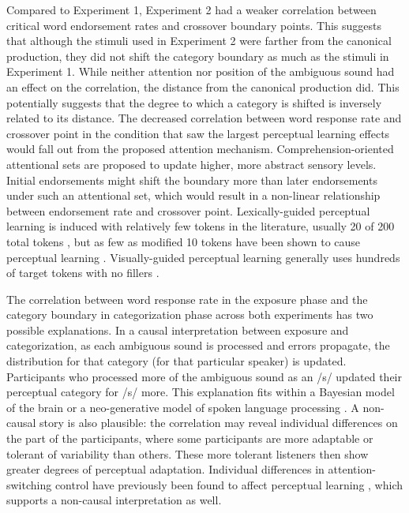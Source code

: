 Compared to Experiment 1, Experiment 2 had a weaker correlation between critical word endorsement rates and crossover boundary points.
This suggests that although the stimuli used in Experiment 2 were farther from the canonical production, they did not shift the category boundary as much as the stimuli in Experiment 1.  
While neither attention nor position of the ambiguous sound had an effect on the correlation, the distance from the canonical production did.  
This potentially suggests that the degree to which a category is shifted is inversely related to its distance.
The decreased correlation between word response rate and crossover point in the condition that saw the largest perceptual learning effects would fall out from the proposed attention mechanism.
Comprehension-oriented attentional sets are proposed to update higher, more abstract sensory levels.
Initial endorsements might shift the boundary more than later endorsements under such an attentional set, which would result in a non-linear relationship between endorsement rate and crossover point.
Lexically-guided perceptual learning is induced with relatively few tokens in the literature, usually 20 of 200 total tokens \citep{Norris2003, Reinish2013}, but as few as modified 10 tokens have been shown to cause perceptual learning \citep{Kraljic2008}.
Visually-guided perceptual learning generally uses hundreds of target tokens with no fillers \citep{Vroomen2007, Reinisch2014}.

The correlation between word response rate in the exposure phase and the category boundary in categorization phase across both experiments has two possible explanations. 
In a causal interpretation between exposure and categorization, as each ambiguous sound is processed and errors propagate, the distribution for that category (for that particular speaker) is updated.
Participants who processed more of the ambiguous sound as an /s/ updated their perceptual category for /s/ more. 
This explanation fits within a Bayesian model of the brain \citep{Clark2013} or a neo-generative model of spoken language processing \citep{Pierrehumbert2002}.  
A non-causal story is also plausible:  the correlation may reveal individual differences on the part of the participants, where some participants are more adaptable or tolerant of variability than others.
These more tolerant listeners then show greater degrees of perceptual adaptation. 
Individual differences in attention-switching control have previously been found to affect perceptual learning \citep{Scharenborg2014}, which supports a non-causal interpretation as well.

